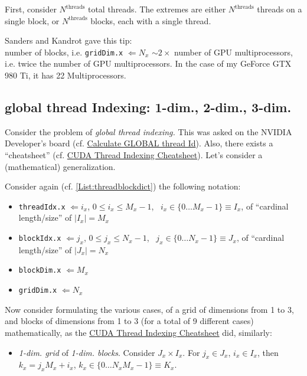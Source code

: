 \documentclass[10pt]{amsart}
\begin{document}
\begin{multicols*}{2}
First, consider $N^{\text{threads}}$ total threads.  The extremes are either $N^{\text{threads}}$ threads on a single block, or $N^{\text{threads}}$ blocks, each with a single thread.

Sanders and Kandrot gave this tip:  \\

number of blocks, i.e. \verb|gridDim.x| $\Longleftarrow N_x$ $\sim 2 \times $ number of GPU multiprocessors, i.e. twice the number of GPU multiprocessors.  In the case of my GeForce GTX 980 Ti, it has 22 Multiprocessors.  

\subsection{global thread Indexing: 1-dim., 2-dim., 3-dim.}

Consider the problem of \emph{global thread indexing.}  This was asked on the NVIDIA Developer's board (cf. \href{https://devtalk.nvidia.com/default/topic/498642/calculate-global-thread-id/?offset=2}{Calculate GLOBAL thread Id}).  Also, there exists a ``cheatsheet'' (cf. \href{https://cs.calvin.edu/courses/cs/374/CUDA/CUDA-Thread-Indexing-Cheatsheet.pdf}{CUDA Thread Indexing Cheatsheet}).  Let's consider a (mathematical) generalization.

Consider again (cf. \ref{List:threadblockdict}) the following notation: 
\begin{itemize}
	\item \verb|threadIdx.x| $\Longleftarrow i_x$, $0\leq i_x \leq M_x -1$, \qquad \, $i_x \in \lbrace 0 \dots M_x - 1\rbrace \equiv I_x$, of ``cardinal length/size'' of $|I_x| = M_x$
	\item \verb|blockIdx.x| $\Longleftarrow j_x$, $0\leq j_x \leq N_x -1$, \qquad \, $j_x \in \lbrace 0 \dots N_x - 1\rbrace \equiv J_x$, of ``cardinal length/size'' of $|J_x| = N_x$
	\item \verb|blockDim.x| $\Longleftarrow M_x$
	\item \verb|gridDim.x| $\Longleftarrow N_x$
\end{itemize}

Now consider formulating the various cases, of a grid of dimensions from 1 to 3, and blocks of dimensions from 1 to 3 (for a total of 9 different cases) mathematically, as the \href{https://cs.calvin.edu/courses/cs/374/CUDA/CUDA-Thread-Indexing-Cheatsheet.pdf}{CUDA Thread Indexing Cheatsheet} did, similarly:

\begin{itemize}
	\item \emph{1-dim. grid} of \emph{1-dim. blocks}.   Consider $J_x\times I_x$.  For $j_x \in J_x$, $i_x \in I_x$, then $k_x = j_x M_x + i_x$, $k_x \in \lbrace 0 \dots N_xM_x-1\rbrace \equiv K_x$.
	

\end{itemize}
\end{multicols*}
\end{document}
